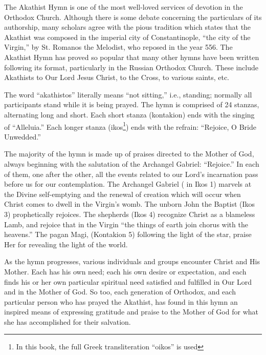 \foreword

{\textsc The Akathist Hymn} is one of the most well-loved services of devotion in the Orthodox Church. Although there is some debate concerning the particulars of its authorship, many scholars agree with the pious tradition which states that the Akathist was composed in the imperial city of Constantinople, ``the city of the Virgin,'' by St. Romanos the Melodist, who reposed in the year 556. The Akathist Hymn has proved so popular that many other hymns have been written following its format, particularly in the Russian Orthodox Church. These include Akathists to Our Lord Jesus Christ, to the Cross, to various saints, etc.

The word ``akathistos'' literally means ``not sitting,'' i.e., standing; normally all participants stand while it is being prayed. The hymn is comprised of 24 stanzas, alternating long and short. Each short stanza (kontakion) ends with the singing of ``Alleluia.'' Each longer stanza (ikos\footnote{In this book, the full Greek transliteration ``oikos'' is used}) ends with the refrain: ``Rejoice, O Bride Unwedded.''

The majority of the hymn is made up of praises directed to the Mother of God, always beginning with the salutation of the Archangel Gabriel: ``Rejoice.'' In each of them, one after the other, all the events related to our Lord's incarnation pass before us for our contemplation. The Archangel Gabriel ( in Ikos 1) marvels at the Divine self-emptying and the renewal of creation which will occur when Christ comes to dwell in the Virgin's womb. The unborn John the Baptist (Ikos 3) prophetically rejoices. The shepherds (Ikos 4) recognize Christ as a blameless Lamb, and rejoice that in the Virgin ``the things of earth join chorus with the heavens.'' The pagan Magi, (Kontakion 5) following the light of the star, praise Her for revealing the light of the world.

As the hymn progresses, various individuals and groups encounter Christ and His Mother. Each has his own need; each his own desire or expectation, and each finds his or her own particular spiritual need satisfied and fulfilled in Our Lord and in the Mother of God. So too, each generation of Orthodox, and each particular person who has prayed the Akathist, has found in this hymn an inspired means of expressing gratitude and praise to the Mother of God for what she has accomplished for their salvation.

